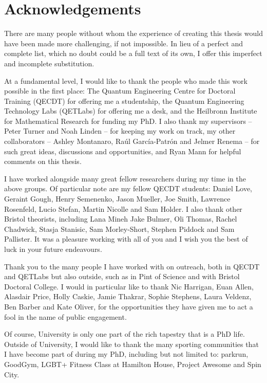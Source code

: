 \chapter*{Acknowledgements}

There are many people without whom the experience of creating this thesis would have been made more challenging, if not impossible. In lieu of a perfect and complete list, which no doubt could be a full text of its own, I offer this imperfect and incomplete substitution.

At a fundamental level, I would like to thank the people who made this work possible in the first place: The Quantum Engineering Centre for Doctoral Training (QECDT) for offering me a studentship, the Quantum Engineering Technology Labs (QETLabs) for offering me a desk, and the Heilbronn Institute for Mathematical Research for funding my PhD. I also thank my supervisors -- Peter Turner and Noah Linden -- for keeping my work on track, my other collaborators -- Ashley Montanaro, Ra\'{u}l Garc\'{i}a-Patr\'{o}n and Jelmer Renema -- for such great ideas, discussions and opportunities, and Ryan Mann for helpful comments on this thesis.

I have worked alongside many great fellow researchers during my time in the above groups. Of particular note are my fellow QECDT students: Daniel Love, Geraint Gough, Henry Semenenko, Jason Mueller, Joe Smith, Lawrence Rosenfeld, Lucio Stefan, Martin Nicolle and Sam Holder. I also thank other Bristol theorists, including Lana Mineh Jake Bulmer, Oli Thomas, Rachel Chadwick, Stasja Stanisic, Sam Morley-Short, Stephen Piddock and Sam Pallister. It was a pleasure working with all of you and I wish you the best of luck in your future endeavours.

Thank you to the many people I have worked with on outreach, both in QECDT and QETLabs but also outside, such as in Pint of Science and with Bristol Doctoral College. I would in particular like to thank Nic Harrigan, Euan Allen, Alasdair Price, Holly Caskie, Jamie Thakrar, Sophie Stephens, Laura Veldenz, Ben Barber and Kate Oliver, for the opportunities they have given me to act a fool in the name of public engagement.

Of course, University is only one part of the rich tapestry that is a PhD life. Outside of University, I would like to thank the many sporting communities that I have become part of during my PhD, including but not limited to: parkrun, GoodGym, LGBT+ Fitness Class at Hamilton House, Project Awesome and Spin City.


